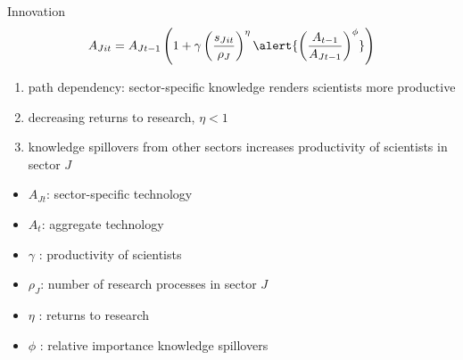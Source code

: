 \documentclass[11pt,aspectratio=169]{beamer}
\begin{document}
\addtocounter{framenumber}{-1}
\begin{frame}{Innovation}
\large
\begin{align*}
	A_{Jit}={A_{Jt-1}}\left(1+\gamma\left(\frac{s_{Jit}}{\rho_J}\right)^\eta\alert{\left(\frac{A_{t-1}}{A_{Jt-1}}\right)^\phi}\right)
\end{align*}
\normalsize
\begin{enumerate}
	\item path dependency: sector-specific knowledge renders scientists more productive
	\item decreasing returns to research, $\eta<1$
	\item \alert{knowledge spillovers} from other sectors increases productivity of scientists in sector $J$ \footnotesize{\citep{Barbieri2021GreenPolicy}}
\end{enumerate}
\small
\vspace{4mm}
\hspace{-2mm}
\begin{minipage}[t!]{0.43\textwidth}
	\vspace{0mm}
	\begin{itemize}
		\item[] $A_{Jt}$: sector-specific technology
		\vspace{-2mm}		
		\item[] $A_t$: aggregate technology 
		\vspace{-2mm}
		\item[] $\gamma$ : productivity of scientists
	\end{itemize}
\end{minipage}
\vspace{-5mm}
\begin{minipage}[t!]{0.55\textwidth}
	\vspace{0mm}
	\begin{itemize}	
		\item[] $\rho_J$: number of research processes in sector $J$
		\vspace{-2mm}			
		\item[] $\eta$ : returns to research
		\vspace{-2mm}			
		\item[] $\phi$ : relative importance knowledge spillovers
	\end{itemize}
\end{minipage}
\end{frame}
\end{document}
